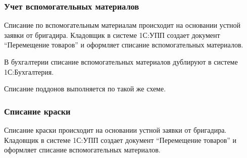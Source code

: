 



\subsubsection{Учет вспомогательных материалов}

Списание по вспомогательным материалам происходит на основании устной заявки от бригадира. Кладовщик в системе 1С:УПП создает документ “Перемещение товаров” и оформляет списание вспомогательных материалов.

В бухгалтерии списание вспомогательных материалов дублируют в системе 1С:Бухгалтерия.

Списание поддонов выполняется по такой же схеме.



\subsubsection{Списание краски}

Списание краски происходит на основании устной заявки от бригадира. Кладовщик в системе 1С:УПП создает документ “Перемещение товаров” и оформляет списание вспомогательных материалов.


